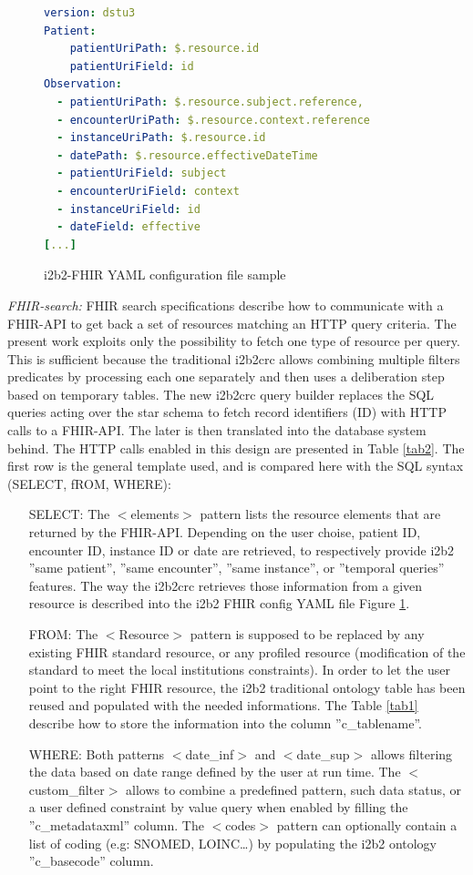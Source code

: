 \documentclass{amia}
\begin{document}
\begin{figure}
\begin{lstlisting}[language=yaml]
version: dstu3
Patient:
    patientUriPath: $.resource.id
    patientUriField: id
Observation:
  - patientUriPath: $.resource.subject.reference,
  - encounterUriPath: $.resource.context.reference
  - instanceUriPath: $.resource.id
  - datePath: $.resource.effectiveDateTime
  - patientUriField: subject
  - encounterUriField: context
  - instanceUriField: id
  - dateField: effective
[...]
\end{lstlisting}
  \caption{i2b2-FHIR YAML configuration file sample}
	\label{conf1}
\end{figure}
\textit{FHIR-search:} FHIR search specifications\cite{FHIR} describe how to communicate with a FHIR-API to get back a set of resources matching an HTTP query criteria. The present work exploits only the possibility to fetch one type of resource per query. This is sufficient because the traditional i2b2crc allows combining multiple filters predicates by processing each one separately and then uses a deliberation step based on temporary tables. The new i2b2crc query builder replaces the SQL queries acting over the star schema to fetch record identifiers (ID) with HTTP calls to a FHIR-API. The later is then translated into the database system behind. The HTTP calls enabled in this design are presented in Table \ref{tab2}. The first row is the general template used, and is compared here with the SQL syntax (SELECT, fROM, WHERE):
\begin{itemize}
	\item[SELECT:] The $<$elements$>$ pattern lists the resource elements that are returned by the FHIR-API. Depending on the user choise, patient ID, encounter ID, instance ID or date are retrieved, to respectively provide i2b2 ''same patient'', ''same encounter'', ''same instance'', or ''temporal queries'' features. The way the i2b2crc retrieves those information from a given resource is described into the i2b2 FHIR config YAML file Figure \ref{conf1}.
	\item[FROM:] The $<$Resource$>$ pattern is supposed to be replaced by any existing FHIR standard resource, or any profiled resource (modification of the standard to meet the local institutions constraints). In order to let the user point to the right FHIR resource, the i2b2 traditional ontology table has been reused and populated with the needed informations. The Table \ref{tab1} describe how to store the information into the column ''c\_tablename''.
	\item [WHERE:] Both patterns $<$date\_inf$>$ and $<$date\_sup$>$ allows filtering the data based on date range defined by the user at run time. The $<$custom\_filter$>$ allows to combine a predefined pattern, such data status, or a user defined constraint by value query when enabled by filling the ''c\_metadataxml'' column. The $<$codes$>$ pattern can optionally contain a list of coding (e.g: SNOMED, LOINC\ldots) by populating the i2b2 ontology ''c\_basecode'' column.
\end{itemize}
\end{document}
